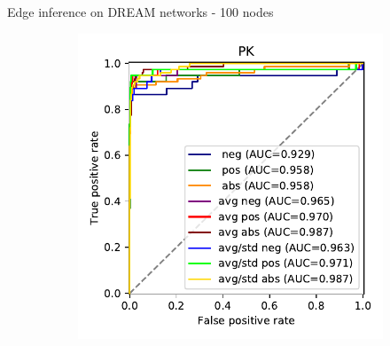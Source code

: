 \begin{frame}{Edge inference on DREAM networks - 100 nodes}
\begin{figure}[ht]
\centering
\begin{subfigure}[b]{0.24\textwidth}\centering\caption{}
\includegraphics[width=\textwidth]{analysis/fig/roc_pk_prim.pdf}
\end{subfigure}
\hfill
\begin{subfigure}[b]{0.24\textwidth}\centering\caption{}

\end{subfigure}
\end{figure}
\end{frame}
